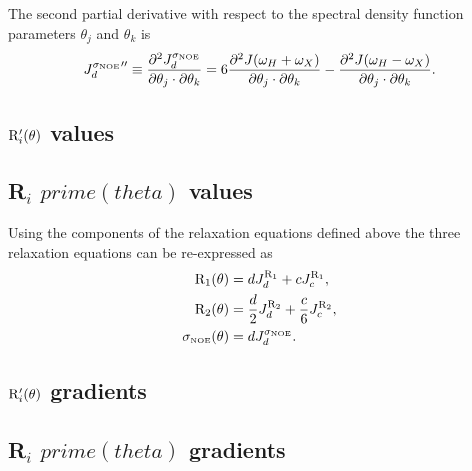 \noindent The second partial derivative with respect to the spectral density function parameters $\theta_j$ and $\theta_k$ is
\begin{equation}
    {J_d^{\sigma_{\scriptscriptstyle \mathrm{NOE}}}}'' \equiv \frac{\partial^2 J_d^{\sigma_{\scriptscriptstyle \mathrm{NOE}}}}{\partial \theta_j \cdot \partial \theta_k}
        = 6 \frac{\partial^2 J(\omega_H + \omega_X)}{\partial \theta_j \cdot \partial \theta_k}
          - \frac{\partial^2 J(\omega_H - \omega_X)}{\partial \theta_j \cdot \partial \theta_k}.  \label{eq: J terms: JsigmaNOEd"}
\end{equation}




\begin{latexonly}
    \subsection{$\mathrm{R}_i'(\theta)$ values}
\end{latexonly}
\begin{htmlonly}
    \subsection{R$_i$ $prime(theta)$ values}
\end{htmlonly}

Using the components of the relaxation equations defined above the three relaxation equations can be re-expressed as
\begin{subequations}
\begin{align}
    \mathrm{R}_1(\theta) & = d J_d^{\mathrm{R}_1} + c J_c^{\mathrm{R}_1},                          \label{eq: Ri': R1} \\
    \mathrm{R}_2(\theta) & = \frac{d}{2} J_d^{\mathrm{R}_2} + \frac{c}{6} J_c^{\mathrm{R}_2},      \label{eq: Ri': R2} \\
    \sigma_{\scriptscriptstyle \mathrm{NOE}}(\theta) & = d J_d^{\sigma_{\scriptscriptstyle \mathrm{NOE}}}.                          \label{eq: Ri': sigmaNOE}
\end{align}
\end{subequations}




\begin{latexonly}
    \subsection{$\mathrm{R}_i'(\theta)$ gradients}
\end{latexonly}
\begin{htmlonly}
    \subsection{R$_i$ $prime(theta)$ gradients}
\end{htmlonly}

